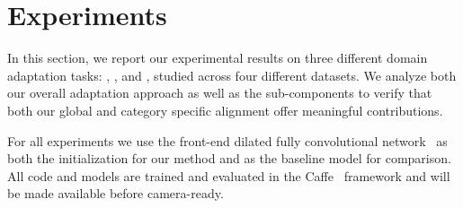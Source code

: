\documentclass[10pt,twocolumn,letterpaper]{article}
\begin{document}
%
 \label{sec:experiments}
\section{Experiments}
In this section, we report our experimental results on three different domain adaptation tasks: , , and , studied across four different datasets. We analyze both our overall adaptation approach as well as the sub-components to verify that both our global and category specific alignment offer meaningful contributions.

For all experiments we use the front-end dilated fully convolutional network~\cite{yu2016multi} as both the initialization for our method and as the baseline model for comparison. All code and models are trained and evaluated in the  Caffe~\cite{jia2014caffe} framework and will be made available before camera-ready.
\end{document}
